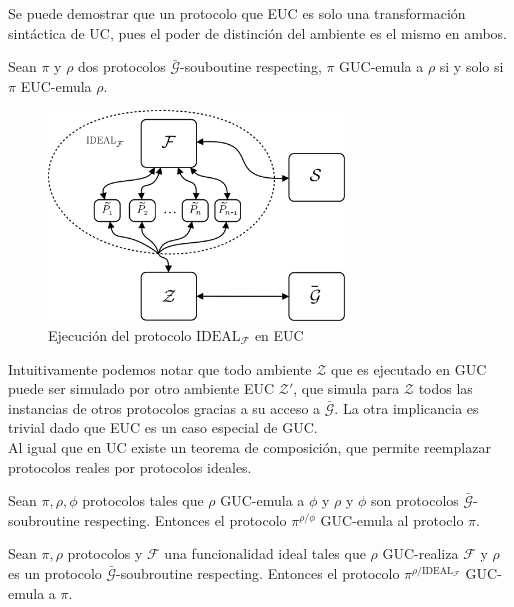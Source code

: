Se puede demostrar que un protocolo que EUC es solo una transformación sintáctica de UC, pues el poder
de distinción del ambiente es el mismo en ambos.

\begin{teorema}
Sean $\pi$ y $\rho$ dos protocolos $\bar{\mathcal{G}}$-souboutine respecting, $\pi$ GUC-emula a
$\rho$ si y solo si $\pi$ EUC-emula $\rho$.
\end{teorema}

\begin{figure}[hp]
    \centering
    \includegraphics[width=0.7\textwidth]{figs/mundo_ideal_guc}
    \caption{Ejecución del protocolo $\textrm{IDEAL}_\mathcal{F}$ en EUC}
    \label{fig:mundo_real_euc}
\end{figure}

Intuitivamente podemos notar que todo ambiente $\mathcal{Z}$ que es ejecutado en GUC puede ser simulado por
otro ambiente EUC $\mathcal{Z'}$, que simula para $\mathcal{Z}$ todos las instancias de otros protocolos gracias
a su acceso a $\bar{\mathcal{G}}$. La otra implicancia es trivial dado que EUC es un caso especial de GUC.\\

Al igual que en UC existe un teorema de composición, que permite reemplazar protocolos reales por protocolos
ideales.

\begin{teorema}
Sean $\pi, \rho, \phi$ protocolos tales que $\rho$ GUC-emula a $\phi$ y $\rho$ y $\phi$ son protocolos
$\bar{\mathcal{G}}$-soubroutine respecting. Entonces el protocolo $\pi^{\rho/\phi}$ GUC-emula al protoclo $\pi$.
\end{teorema}

\begin{corolario}
Sean $\pi, \rho$ protocolos y $\mathcal{F}$ una funcionalidad ideal tales que $\rho$ GUC-realiza
$\mathcal{F}$ y $\rho$ es un protocolo $\bar{\mathcal{G}}$-soubroutine respecting. Entonces el protocolo
$\pi^{\rho/\mathrm{IDEAL}_\mathcal{F}}$ GUC-emula a $\pi$.
\label{corolario:uc-realizacion}
\end{corolario}

